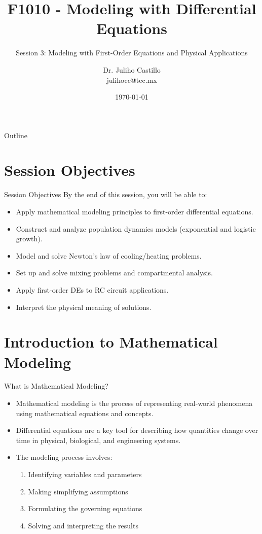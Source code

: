 \documentclass[10pt,aspectratio=169]{beamer}
\title{F1010 - Modeling with Differential Equations}
\subtitle{Session 3: Modeling with First-Order Equations and Physical Applications}
\author{Dr. Juliho Castillo\\julihocc@tec.mx}
\institute{Tec de Monterrey}
\date{\today}
\begin{document}
\maketitle

\begin{frame}{Outline}
    \tableofcontents
\end{frame}

\section{Session Objectives}
\begin{frame}{Session Objectives}
    By the end of this session, you will be able to:
    \begin{itemize}
        \item Apply mathematical modeling principles to first-order differential equations.
        \item Construct and analyze population dynamics models (exponential and logistic growth).
        \item Model and solve Newton's law of cooling/heating problems.
        \item Set up and solve mixing problems and compartmental analysis.
        \item Apply first-order DEs to RC circuit applications.
        \item Interpret the physical meaning of solutions.
    \end{itemize}
\end{frame}

\section{Introduction to Mathematical Modeling}
\begin{frame}{What is Mathematical Modeling?}
    \begin{itemize}
        \item Mathematical modeling is the process of representing real-world phenomena using mathematical equations and concepts.
        \item Differential equations are a key tool for describing how quantities change over time in physical, biological, and engineering systems.
        \item The modeling process involves:
        \begin{enumerate}
            \item Identifying variables and parameters
            \item Making simplifying assumptions
            \item Formulating the governing equations
            \item Solving and interpreting the results
        \end{enumerate}
    \end{itemize}
\end{frame}
\end{document}
